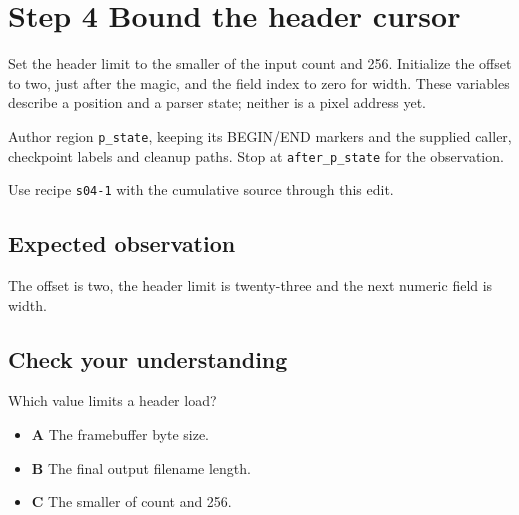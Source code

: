 \section{Step 4 Bound the header cursor}\label{ppm-s04}

Set the header limit to the smaller of the input count and 256. Initialize the offset to two, just after the magic, and the field index to zero for width. These variables describe a position and a parser state; neither is a pixel address yet.

Author region \texttt{p\_state}, keeping its BEGIN/END markers and the supplied caller, checkpoint labels and cleanup paths. Stop at \texttt{after\_p\_state} for the observation.

Use recipe \texttt{s04-1} with the cumulative source through this edit.

\subsection{Expected observation}
The offset is two, the header limit is twenty-three and the next numeric field is width.

\subsection{Check your understanding}
Which value limits a header load?

\begin{itemize}
  \item \textbf{A} The framebuffer byte size.
  \item \textbf{B} The final output filename length.
  \item \textbf{C} The smaller of count and 256.
\end{itemize}
